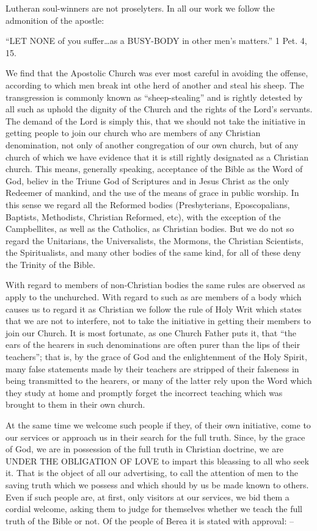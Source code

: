\documentclass[
]{book}
\begin{document}
Lutheran soul-winners are not proselyters. In all our work we follow the admonition of the apostle:

``LET NONE of you suffer\ldots as a BUSY-BODY in other men's matters.'' 1 Pet. 4, 15.

We find that the Apostolic Church was ever most careful in avoiding the offense, according to which men break int othe herd of another and steal his sheep. The transgression is commonly known as ``sheep-stealing'' and is rightly detested by all such as uphold the dignity of the Church and the rights of the Lord's servants. The demand of the Lord is simply this, that we should not take the initiative in getting people to join our church who are members of any Christian denomination, not only of another congregation of our own church, but of any church of which we have evidence that it is still rightly designated as a Christian church. This means, generally speaking, acceptance of the Bible as the Word of God, believ in the Triune God of Scriptures and in Jesus Christ as the only Redeemer of mankind, and the use of the means of grace in public worship. In this sense we regard all the Reformed bodies (Presbyterians, Eposcopalians, Baptists, Methodists, Christian Reformed, etc), with the exception of the Campbellites, as well as the Catholics, as Christian bodies. But we do not so regard the Unitarians, the Universalists, the Mormons, the Christian Scientists, the Spiritualists, and many other bodies of the same kind, for all of these deny the Trinity of the Bible.

With regard to members of non-Christian bodies the same rules are observed as apply to the unchurched. With regard to such as are members of a body which causes us to regard it as Christian we follow the rule of Holy Writ which states that we are not to interfere, not to take the initiative in getting their members to join our Church. It is most fortunate, as one Church Father puts it, that ``the ears of the hearers in such denominations are often purer than the lips of their teachers''; that is, by the grace of God and the enlightenment of the Holy Spirit, many false statements made by their teachers are stripped of their falseness in being transmitted to the hearers, or many of the latter rely upon the Word which they study at home and promptly forget the incorrect teaching which was brought to them in their own church.

At the same time we welcome such people if they, of their own initiative, come to our services or approach us in their search for the full truth. Since, by the grace of God, we are in possession of the full truth in Christian doctrine, we are UNDER THE OBLIGATION OF LOVE to impart this bleassing to all who seek it. That is the object of all our advertising, to call the attention of men to the saving truth which we possess and which should by us be made known to others. Even if such people are, at first, only visitors at our services, we bid them a cordial welcome, asking them to judge for themselves whether we teach the full truth of the Bible or not. Of the people of Berea it is stated with approval: --
\end{document}
